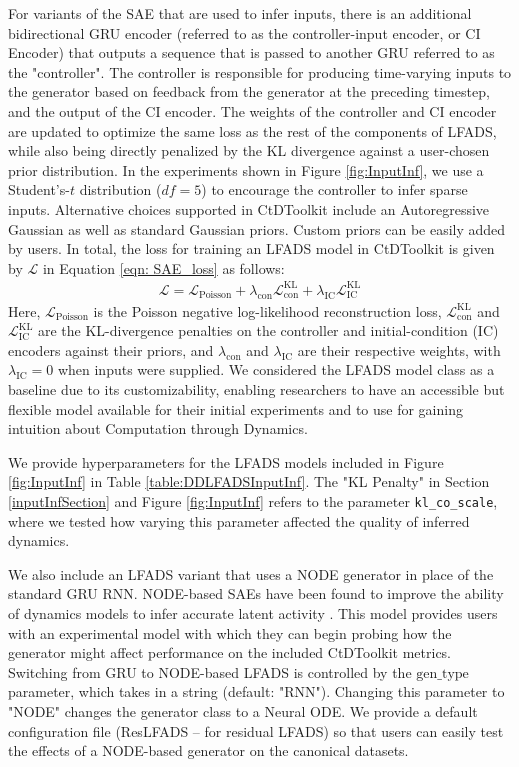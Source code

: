 \documentclass{article}
\begin{document}
For variants of the SAE that are used to infer inputs, there is an additional bidirectional GRU encoder (referred to as the controller-input encoder, or CI Encoder) that outputs a sequence that is passed to another GRU referred to as the "controller". The controller is responsible for producing time-varying inputs to the generator based on feedback from the generator at the preceding timestep, and the output of the CI encoder. The weights of the controller and CI encoder are updated to optimize the same loss as the rest of the components of LFADS, while also being directly penalized by the KL divergence against a user-chosen prior distribution. In the experiments shown in Figure \ref{fig:InputInf}, we use a Student's-$t$ distribution ($df = 5$) to encourage the controller to infer sparse inputs. Alternative choices supported in CtDToolkit include an Autoregressive Gaussian as well as standard Gaussian priors. Custom priors can be easily added by users. In total, the loss for training an LFADS model in CtDToolkit is given by $\mathcal{L}$ in Equation \ref{eqn: SAE_loss} as follows:
\begin{align}
    \mathcal{L} = \mathcal{L}_{\text{Poisson}} + \lambda_{\text{con}} \mathcal{L}^{\text{KL}}_{\text{con}} + \lambda_{\text{IC}} \mathcal{L}^{\text{KL}}_{\text{IC}} \label{eqn: SAE_loss}
\end{align}
Here, $\mathcal{L}_{\text{Poisson}}$ is the Poisson negative log-likelihood reconstruction loss, $\mathcal{L}^{\text{KL}}_{\text{con}}$ and $\mathcal{L}^{\text{KL}}_{\text{IC}}$ are the KL-divergence penalties on the controller and initial-condition (IC) encoders against their priors, and $\lambda_{\text{con}}$ and $\lambda_{\text{IC}}$ are their respective weights, with $\lambda_{\text{IC}} = 0$ when inputs were supplied. We considered the LFADS model class as a baseline due to its customizability, enabling researchers to have an accessible but flexible model available for their initial experiments and to use for gaining intuition about Computation through Dynamics.

We provide hyperparameters for the LFADS models included in Figure \ref{fig:InputInf} in Table \ref{table:DDLFADSInputInf}. The "KL Penalty" in Section \ref{inputInfSection} and Figure \ref{fig:InputInf} refers to the parameter \texttt{kl\_co\_scale}, where we tested how varying this parameter affected the quality of inferred dynamics.

We also include an LFADS variant that uses a NODE generator in place of the standard GRU RNN. NODE-based SAEs have been found to improve the ability of dynamics models to infer accurate latent activity \cite{kim2021inferring, sedler_expressive_2022}. This model provides users with an experimental model with which they can begin probing how the generator might affect performance on the included CtDToolkit metrics. Switching from GRU to NODE-based LFADS is controlled by the $\text{gen\_type}$ parameter, which takes in a string (default: "RNN"). Changing this parameter to "NODE" changes the generator class to a Neural ODE. We provide a default configuration file (ResLFADS -- for residual LFADS) so that users can easily test the effects of a NODE-based generator on the canonical datasets.
\end{document}
